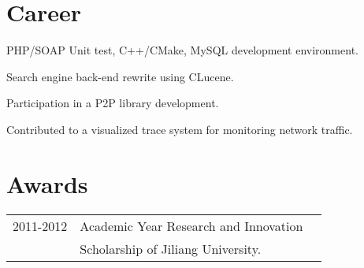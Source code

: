 \documentclass[]{deedy-resume-openfont}
\begin{document}
\begin{minipage}[t]{0.66\textwidth} 


\section{Career}
\vspace{\topsep} %
\begin{tightemize}
\item PHP/SOAP Unit test, C++/CMake, MySQL development environment.
\item Search engine back-end rewrite using CLucene.
\end{tightemize}
\sectionsep


\vspace{\topsep} %
\begin{tightemize}
\item Participation in a P2P library development.
\item Contributed to a visualized trace system for monitoring network traffic.
\end{tightemize}
\sectionsep


\section{Awards} 
\begin{tabular}{rll}
2011-2012 & Academic Year Research and Innovation \\ 
& Scholarship of Jiliang University. \\
\end{tabular}
\sectionsep


\end{minipage}
\end{document}
